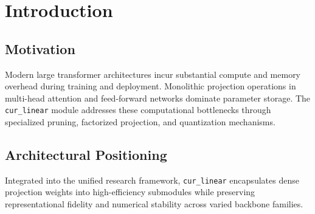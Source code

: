 \section{Introduction}

\subsection{Motivation}
Modern large transformer architectures incur substantial compute and memory overhead during training and deployment. Monolithic projection operations in multi-head attention and feed-forward networks dominate parameter storage. The \texttt{cur_linear} module addresses these computational bottlenecks through specialized pruning, factorized projection, and quantization mechanisms.

\subsection{Architectural Positioning}
Integrated into the unified research framework, \texttt{cur_linear} encapsulates dense projection weights into high-efficiency submodules while preserving representational fidelity and numerical stability across varied backbone families.
